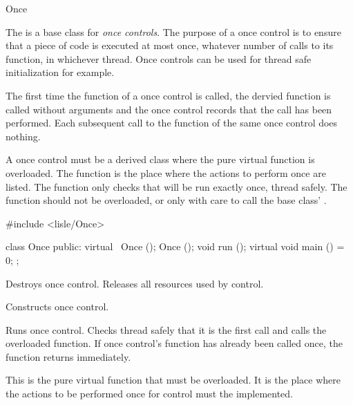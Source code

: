 
\begin{classpage}{Once}

The  is a base class for {\em once controls}.  The
purpose of a once control is to ensure that a piece of code is
executed at most once, whatever number of calls to its 
function, in whichever thread. Once controls can be used for thread
safe initialization for example.

The first time the  function of a once control is called,
the dervied  function is called without arguments and the
once control records that the call has been performed. Each subsequent
call to the  function of the same once control does nothing.

A once control must be a  derived class where the
pure virtual  function is overloaded. The 
function is the place where the actions to perform once are listed.
The  function only checks that  will be run
exactly once, thread safely. The  function should not be
overloaded, or only with care to call the base class' .

\begin{mansynopsis}
#include <lisle/Once>

class Once
{
public:
  virtual ~Once ();
  Once ();
  void run ();
  virtual void main () = 0;
};
\end{mansynopsis}

\begin{mandescription}
  \destructor
  Destroys  once control. Releases all resources used by
   control.

  \constructor{}
  Constructs  once control.

  Runs  once control. Checks thread safely that it is the
  first call and calls the overloaded  function. If
   once control's  function has already been
  called once, the function returns immediately.

  This is the pure virtual function that must be overloaded. It is
  the place where the actions to be performed once for 
  control must the implemented.
\end{mandescription}

\end{classpage}
